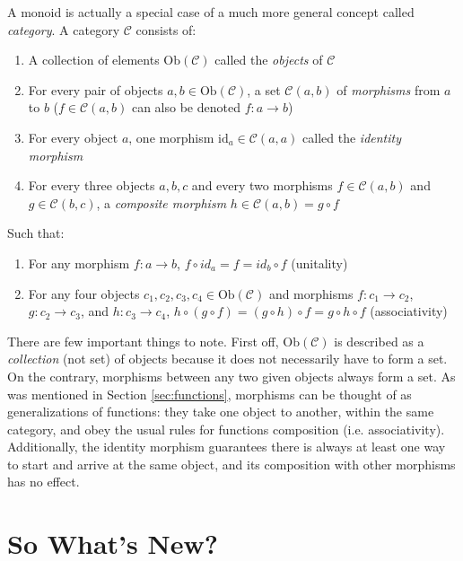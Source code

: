 \documentclass[12pt,a4paper]{article}
\begin{document}
A monoid is actually a special case of a much more general concept called \textit{category}. A category $\mathcal{C}$ consists of:

\begin{enumerate}
\item A collection of elements $\text{Ob}(\mathcal{C})$ called the \textit{objects} of $\mathcal{C}$
\item For every pair of objects $a, b \in \text{Ob}(\mathcal{C})$, a set $\mathcal{C}(a, b)$ of \textit{morphisms} from $a$ to $b$ ($f \in \mathcal{C}(a, b)$ can also be denoted $f: a \to b$)
\item For every object $a$, one morphism $\text{id}_a \in \mathcal{C}(a, a)$ called the \textit{identity morphism}
\item For every three objects $a, b, c$ and every two morphisms $f \in \mathcal{C}(a, b)$ and $g \in \mathcal{C}(b, c)$, a \textit{composite morphism} $h \in \mathcal{C}(a,b) = g \circ f $ 
\end{enumerate}

Such that:

\begin{enumerate}
\renewcommand{\theenumi}{\alph{enumi}}
\item For any morphism $f: a \to b$, $f \circ id_a = f = id_b \circ f$ (unitality)
\item For any four objects $c_1, c_2, c_3, c_4 \in \text{Ob}(\mathcal{C})$ and morphisms $f: c_1 \to c_2$, $g: c_2 \to c_3$, and $h: c_3 \to c_4$, $h \circ (g \circ f) = (g \circ h) \circ f = g \circ h \circ f$ (associativity)
\end{enumerate}


There are few important things to note. First off, $\text{Ob}(\mathcal{C})$ is described as a \textit{collection} (not set) of objects because it does not necessarily have to form a set. On the contrary, morphisms between any two given objects always form a set. As was mentioned in Section \ref{sec:functions}, morphisms can be thought of as generalizations of functions: they take one object to another, within the same category, and obey the usual rules for functions composition (i.e. associativity). Additionally, the identity morphism guarantees there is always at least one way to start and arrive at the same object, and its composition with other morphisms has no effect.



\section{So What's New?}
\label{sec:whatsnew}
\end{document}
